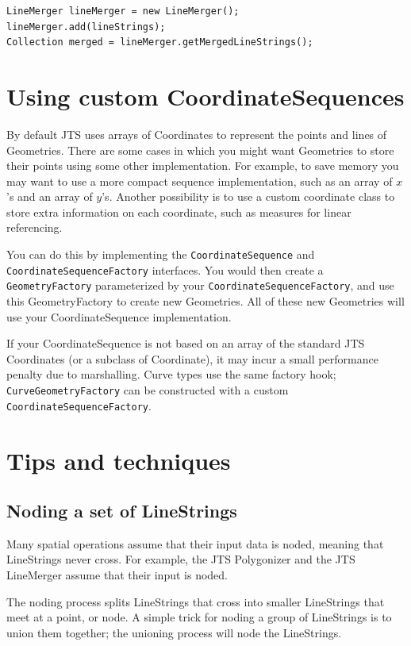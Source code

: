 \documentclass[11pt]{article}
\begin{document}
\begin{lstlisting}
LineMerger lineMerger = new LineMerger();
lineMerger.add(lineStrings);
Collection merged = lineMerger.getMergedLineStrings();
\end{lstlisting}

\section{Using custom CoordinateSequences}
By default JTS uses arrays of Coordinates to represent the points and
lines of Geometries. There are some cases in which you might want
Geometries to store their points using some other implementation. For
example, to save memory you may want to use a more compact sequence
implementation, such as an array of $x$'s and an array of $y$'s.
Another possibility is to use a custom coordinate class to store
extra information on each coordinate, such as measures for linear
referencing.

You can do this by implementing the \texttt{CoordinateSequence} and
\texttt{CoordinateSequenceFactory} interfaces. You would then create
a \texttt{GeometryFactory} parameterized by your
\texttt{CoordinateSequenceFactory}, and use this GeometryFactory to
create new Geometries. All of these new Geometries will use your
CoordinateSequence implementation.

If your CoordinateSequence is not based on an array of the standard
JTS Coordinates (or a subclass of Coordinate), it may incur a small
performance penalty due to marshalling. Curve types use the same
factory hook; \texttt{CurveGeometryFactory} can be constructed with a
custom \texttt{CoordinateSequenceFactory}.

\section{Tips and techniques}

\subsection{Noding a set of LineStrings}
\label{sec:noding}
Many spatial operations assume that their input data is noded,
meaning that LineStrings never cross. For example, the JTS
Polygonizer and the JTS LineMerger assume that their input is noded.

The noding process splits LineStrings that cross into smaller
LineStrings that meet at a point, or node. A simple trick for noding
a group of LineStrings is to union them together; the unioning
process will node the LineStrings.
\end{document}
